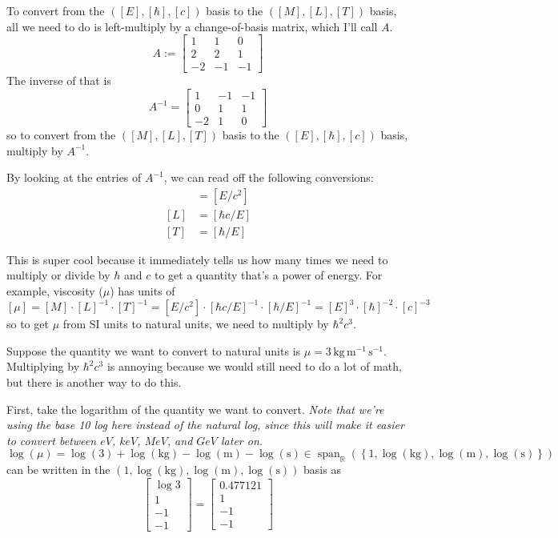 \documentclass[12pt]{article}
\begin{document}
To convert from the $([E], [\hbar], [c])$ basis to the $([M], [L], [T])$ basis, all we need to do is left-multiply by a change-of-basis matrix, which I'll call $A$.
\[A := \begin{bmatrix}
    1 & 1 & 0 \\
    2 & 2 & 1 \\
    -2 & -1 & -1
\end{bmatrix} \]
The inverse of that is
\[ A^{-1} = \begin{bmatrix}
    1 & -1 & -1 \\
    0 & 1 & 1 \\
    -2 & 1 & 0
\end{bmatrix} \]
so to convert from the $([M], [L], [T])$ basis to the $([E], [\hbar], [c])$ basis, multiply by $A^{-1}$.
\par
By looking at the entries of $A^{-1}$, we can read off the following conversions:
\begin{align*}
    [M] &= [E/c^2] \\
    [L] &= [\hbar c / E] \\
    [T] &= [\hbar / E]
\end{align*}
\par
This is super cool because it immediately tells us how many times we need to multiply or divide by $\hbar$ and $c$ to get a quantity that's a power of energy. For example, viscosity ($\mu$) has units of
\[ [\mu] = [M] \cdot [L]^{-1} \cdot [T]^{-1} = [E/c^2] \cdot [\hbar c / E]^{-1} \cdot [\hbar / E]^{-1} = [E]^3 \cdot [\hbar]^{-2} \cdot [c]^{-3} \]
so to get $\mu$ from SI units to natural units, we need to multiply by $\hbar^2c^3$.
\par
Suppose the quantity we want to convert to natural units is $\mu = 3 \, \mathrm{kg} \, \mathrm{m}^{-1} \, \mathrm{s}^{-1}$. Multiplying by $\hbar^2 c^3$ is annoying because we would still need to do a lot of math, but there is another way to do this.
\par
First, take the logarithm of the quantity we want to convert. \textit{Note that we're using the base 10 log here instead of the natural log, since this will make it easier to convert between $eV$, $keV$, $MeV$, and $GeV$ later on.}
\[ \log (\mu) = \log(3) + \log (\mathrm{kg}) - \log(\mathrm{m}) - \log(\mathrm{s}) \in \operatorname{span}_\mathbb{R} \left( \left\{ 1, \log(\mathrm{kg}), \log(\mathrm{m}), \log(\mathrm{s}) \right\} \right) \]
can be written in the $(1, \log(\mathrm{kg}), \log(\mathrm{m}), \log(\mathrm{s}))$ basis as
\[ \begin{bmatrix}
    \log 3 \\
    1 \\
    -1 \\
    -1
\end{bmatrix} = \begin{bmatrix}
    0.477121 \\
    1 \\
    -1 \\
    -1
\end{bmatrix} \]
\end{document}
